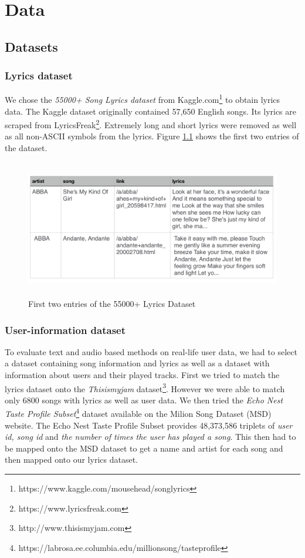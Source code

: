 \chapter{Data}

\section{Datasets}

\subsection{Lyrics dataset}
 We chose the \textit{55000+ Song Lyrics dataset} from
 Kaggle.com\footnote{https://www.kaggle.com/mousehead/songlyrics} to obtain lyrics
 data. The Kaggle dataset originally contained 57,650 English songs. Its lyrics are
 scraped from LyricsFreak\footnote{https://www.lyricsfreak.com}. Extremely long and short lyrics were removed as well as
 all non-ASCII symbols from the lyrics. Figure \ref{fig:lyrics_dataset} shows the
 first two entries of the dataset.\\
 \begin{figure}[h]
    \centering
	\includegraphics[height=60mm]{./img/dataset_preview.png}
	\caption{First two entries of the 55000+ Lyrics Dataset}
	\label{fig:lyrics_dataset}
\end{figure}

\subsection{User-information dataset}
To evaluate text and audio based methods on real-life user data, we had to select a
dataset containing song information and lyrics as well as a dataset with information
about users and their played tracks. First we tried to match the lyrics dataset onto
the \textit{Thisismyjam} dataset\footnote{http://www.thisismyjam.com}. However we
were able to match only 6800 songs with lyrics as well as user data. We then tried
the \textit{Echo Nest Taste Profile Subset}\footnote{https://labrosa.ee.columbia.edu/millionsong/tasteprofile} \cite{Bertin-Mahieux2011} dataset available
on the Milion Song Dataset (MSD) website. 
The Echo Nest Taste Profile Subset provides 48,373,586 triplets of
\textit{user id, song id} and \textit{the number of times the user has played a song}. This then had to be mapped onto the MSD dataset to get a name and artist for each song and then mapped onto our lyrics dataset.

